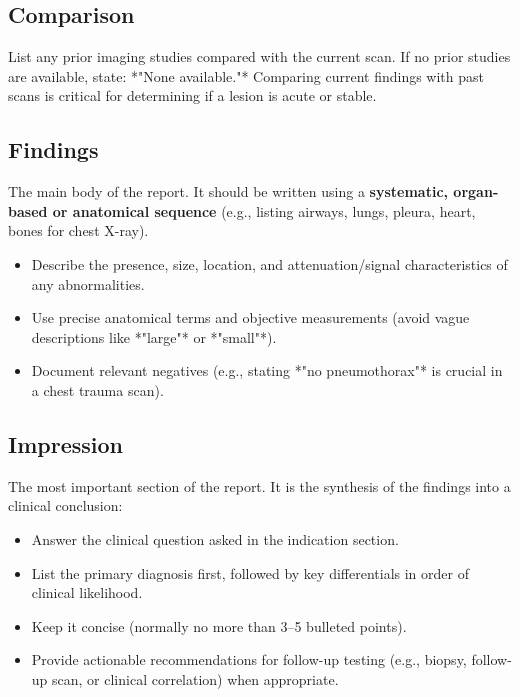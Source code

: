 \subsection*{Comparison}
List any prior imaging studies compared with the current scan. If no prior studies are available, state: *"None available."* Comparing current findings with past scans is critical for determining if a lesion is acute or stable.

\subsection*{Findings}
The main body of the report. It should be written using a \textbf{systematic, organ-based or anatomical sequence} (e.g., listing airways, lungs, pleura, heart, bones for chest X-ray).
\begin{itemize}
    \item Describe the presence, size, location, and attenuation/signal characteristics of any abnormalities.
    \item Use precise anatomical terms and objective measurements (avoid vague descriptions like *"large"* or *"small"*).
    \item Document relevant negatives (e.g., stating *"no pneumothorax"* is crucial in a chest trauma scan).
\end{itemize}

\subsection*{Impression}
The most important section of the report. It is the synthesis of the findings into a clinical conclusion:
\begin{itemize}
    \item Answer the clinical question asked in the indication section.
    \item List the primary diagnosis first, followed by key differentials in order of clinical likelihood.
    \item Keep it concise (normally no more than 3--5 bulleted points).
    \item Provide actionable recommendations for follow-up testing (e.g., biopsy, follow-up scan, or clinical correlation) when appropriate.
\end{itemize}


